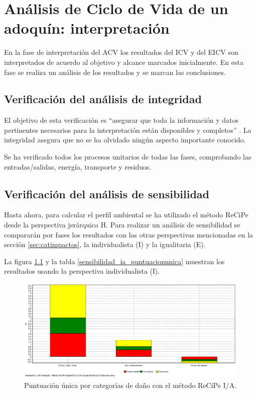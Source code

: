 \chapter{Análisis de Ciclo de Vida de un adoquín: interpretación}\label{cap:acv_interpretacion}

En la fase de interpretación del ACV los resultados del ICV y del EICV son interpretados de acuerdo al objetivo y alcance marcados inicialmente. En esta fase se realiza un análisis de los resultados y se marcan las conclusiones.

\section{Verificación del análisis de integridad}

El objetivo de esta verificación es ``asegurar que toda la información y datos pertinentes necesarios para la interpretación están disponibles y completos'' \cite{iso14044}. La integridad asegura que no se ha olvidado ningún aspecto importante conocido.

Se ha verificado todos los procesos unitarios de todas las fases, comprobando las entradas/salidas, energía, transporte y residuos.

\section{Verificación del análisis de sensibilidad}

Hasta ahora, para calcular el perfil ambiental se ha utilizado el método ReCiPe desde la perspectiva jerárquica H. Para realizar un análisis de sensibilidad se compararán por fases los resultados con las otras perspectivas mencionadas en la sección \ref{sec:catimpactos}, la individualista (I) y la igualitaria (E).

La figura \ref{fig:sensibilidad_ia_puntuacionunica} y la tabla \ref{sensibilidad_ia_puntuacionunica} muestran los resultados usando la perspectiva individualista (I).

\begin{figure}[!htb]
\centering
\includegraphics[width=15cm]{img/sensibilidad_ia_puntuacionunica.png}
\caption{Puntuación única por categorías de daño con el método ReCiPe I/A.}
\label{fig:sensibilidad_ia_puntuacionunica}
\end{figure}

